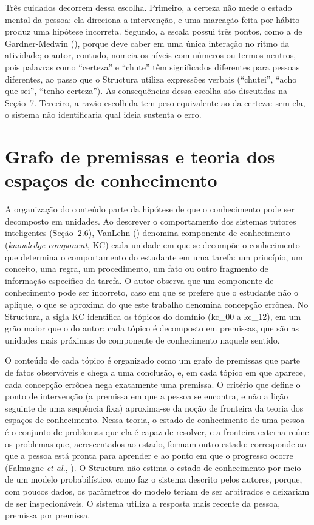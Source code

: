 Três cuidados decorrem dessa escolha. Primeiro, a certeza não mede o estado mental da pessoa: ela direciona a intervenção, e uma marcação feita por hábito produz uma hipótese incorreta. Segundo, a escala possui três pontos, como a de Gardner-Medwin (\citeyear{gardnermedwin2006}), porque deve caber em uma única interação no ritmo da atividade; o autor, contudo, nomeia os níveis com números ou termos neutros, pois palavras como ``certeza'' e ``chute'' têm significados diferentes para pessoas diferentes, ao passo que o Structura utiliza expressões verbais (``chutei'', ``acho que sei'', ``tenho certeza''). As consequências dessa escolha são discutidas na Seção~7. Terceiro, a razão escolhida tem peso equivalente ao da certeza: sem ela, o sistema não identificaria qual ideia sustenta o erro.

\section{Grafo de premissas e teoria dos espaços de conhecimento}

A organização do conteúdo parte da hipótese de que o conhecimento pode ser decomposto em unidades. Ao descrever o comportamento dos sistemas tutores inteligentes (Seção~2.6), VanLehn (\citeyear{vanlehn2006}) denomina componente de conhecimento (\textit{knowledge component}, KC) cada unidade em que se decompõe o conhecimento que determina o comportamento do estudante em uma tarefa: um princípio, um conceito, uma regra, um procedimento, um fato ou outro fragmento de informação específico da tarefa. O autor observa que um componente de conhecimento pode ser incorreto, caso em que se prefere que o estudante não o aplique, o que se aproxima do que este trabalho denomina concepção errônea. No Structura, a sigla KC identifica os tópicos do domínio (kc\_00 a kc\_12), em um grão maior que o do autor: cada tópico é decomposto em premissas, que são as unidades mais próximas do componente de conhecimento naquele sentido.

O conteúdo de cada tópico é organizado como um grafo de premissas que parte de fatos observáveis e chega a uma conclusão, e, em cada tópico em que aparece, cada concepção errônea nega exatamente uma premissa. O critério que define o ponto de intervenção (a premissa em que a pessoa se encontra, e não a lição seguinte de uma sequência fixa) aproxima-se da noção de fronteira da teoria dos espaços de conhecimento. Nessa teoria, o estado de conhecimento de uma pessoa é o conjunto de problemas que ela é capaz de resolver, e a fronteira externa reúne os problemas que, acrescentados ao estado, formam outro estado: corresponde ao que a pessoa está pronta para aprender e ao ponto em que o progresso ocorre (Falmagne \textit{et al.}, \citeyear{falmagne2006}). O Structura não estima o estado de conhecimento por meio de um modelo probabilístico, como faz o sistema descrito pelos autores, porque, com poucos dados, os parâmetros do modelo teriam de ser arbitrados e deixariam de ser inspecionáveis. O sistema utiliza a resposta mais recente da pessoa, premissa por premissa.

